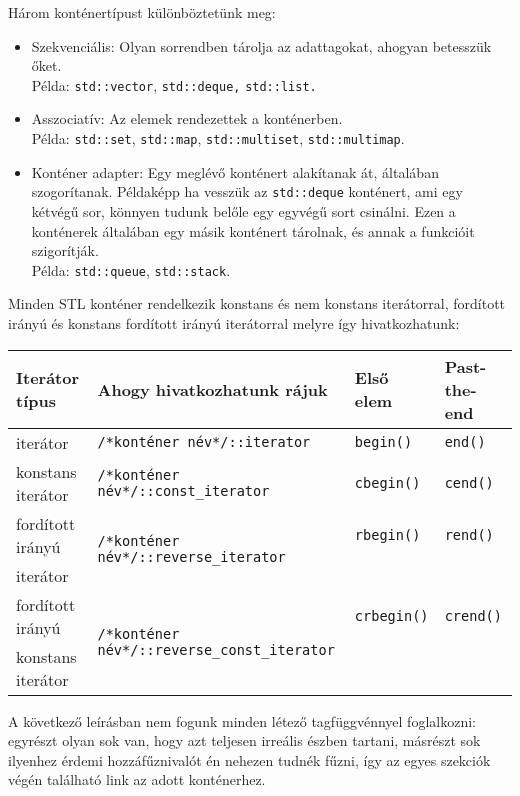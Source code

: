 \documentclass[a4paper,11.5pt]{article}
\begin{document}
	Három konténertípust különböztetünk meg:
	\begin{itemize}
		\item Szekvenciális: Olyan sorrendben tárolja az adattagokat, ahogyan betesszük őket. \\Példa: \texttt{std::vector}, \texttt{std::deque,} \texttt{std::list.}
		\item Asszociatív: Az elemek rendezettek a konténerben.\\ Példa: \texttt{std::set}, \texttt{std::map}, \texttt{std::multiset}, \texttt{std::multimap}.
		\item Konténer adapter: Egy meglévő konténert alakítanak át, általában szogorítanak. Példaképp ha vesszük az \texttt{std::deque} konténert, ami egy kétvégű sor, könnyen tudunk belőle egy egyvégű sort csinálni. Ezen a konténerek általában egy másik konténert tárolnak, és annak a funkcióit szigorítják.
		\\Példa: \texttt{std::queue}, \texttt{std::stack}.
	\end{itemize}
	Minden STL konténer rendelkezik konstans és nem konstans iterátorral, fordított irányú és konstans fordított irányú iterátorral melyre így hivatkozhatunk:
	\begin{center}
		\begin{tabular}{|l|l|l|l|}
			\hline
			Iterátor típus&Ahogy hivatkozhatunk rájuk&Első elem&Past-the-end\\
			\hline
			\hline
			iterátor&\texttt{/*konténer név*/::iterator}&\texttt{begin()}&\texttt{end()}\\
			\hline
			konstans iterátor&\texttt{/*konténer név*/::const\_iterator}&\texttt{cbegin()}&\texttt{cend()}\\
			\hline
			fordított irányú&\multirow{2}{*}{\texttt{/*konténer név*/::reverse\_iterator}}&\texttt{rbegin()}&\texttt{rend()}\\
			iterátor&&&\\
			\hline
			fordított irányú&\multirow{2}{*}{\texttt{/*konténer név*/::reverse\_const\_iterator}}&\texttt{crbegin()}&\texttt{crend()}\\
			konstans iterátor&&&\\
			\hline
		\end{tabular}
	\end{center}
	
	A következő leírásban nem fogunk minden létező tagfüggvénnyel foglalkozni: egyrészt olyan sok van, hogy azt teljesen irreális észben tartani, másrészt sok ilyenhez érdemi hozzáfűznivalót én nehezen tudnék fűzni, így az egyes szekciók végén található link az adott konténerhez.
	
\end{document}
